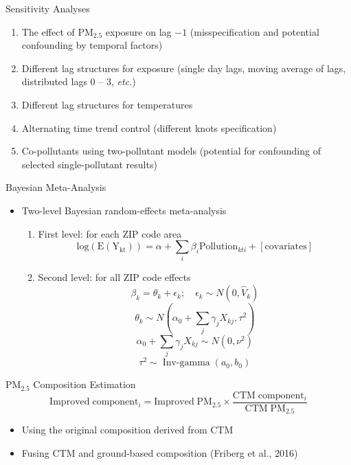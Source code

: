 \documentclass{beamer}
\begin{document}
\begin{frame}{Sensitivity Analyses}
    \begin{enumerate}
        \item The effect of PM$_{2.5}$ exposure on lag $-1$ \textcolor[rgb]{0.1,0.1,0.6}{(misspecification and potential confounding by temporal factors)}
        \item Different lag structures for exposure \textcolor[rgb]{0.1,0.1,0.6}{(single day lags, moving average of lags, distributed lags 0 -- 3, \textit{etc.})}
        \item Different lag structures for temperatures
        \item Alternating time trend control \textcolor[rgb]{0.1,0.1,0.6}{(different knots specification)}
        \item Co-pollutants using two-pollutant models \textcolor[rgb]{0.1,0.1,0.6}{(potential for confounding of selected single-pollutant results)}
    \end{enumerate}
\end{frame}

\begin{frame}{Bayesian Meta-Analysis}
    \begin{itemize}
       \item Two-level Bayesian random-effects meta-analysis
        \begin{enumerate}
            \item First level: for each ZIP code area$$ \mathrm{log(E(Y_{kt}))}=\alpha+\sum_i\beta_i\mathrm{Pollution}_{kti}+[\mathrm{covariates}]$$
            \item Second level: for all ZIP code effects
            $$\beta_k=\theta_k+\epsilon_k; \quad \epsilon_k\sim N(0, \hat{V}_k)$$
            $$\theta_k\sim N(\alpha_0+\sum_j\gamma_jX_{kj}, \tau^2)$$
            $$\alpha_0+\sum_j\gamma_jX_{kj} \sim N(0, \nu^2)$$
            $$\tau^2\sim \operatorname{Inv-gamma}(a_0, b_0)$$
        \end{enumerate}
    \end{itemize}
\end{frame}

\begin{frame}{PM$_{2.5}$ Composition Estimation}
    \begin{equation*}
        \mathrm{Improved\;component_\mathit{i}=Improved\;PM_{2.5}\times\frac{CTM\;component_\mathit{i}}{CTM\;PM_{2.5}}}
    \end{equation*}
    \begin{itemize}
        \item Using the original composition derived from CTM
        \item Fusing CTM and ground-based composition (Friberg et al., 2016)
    \end{itemize}
\end{frame}
\end{document}

